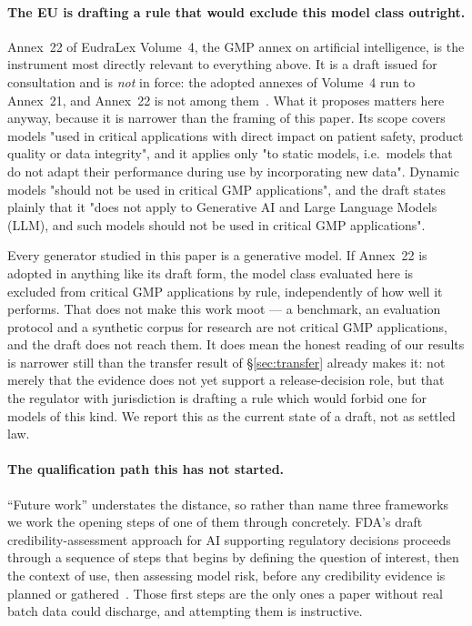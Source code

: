 \documentclass[11pt]{article}
\begin{document}
\paragraph{The EU is drafting a rule that would exclude this model class
outright.} Annex~22 of EudraLex Volume~4, the GMP annex on artificial
intelligence, is the instrument most directly relevant to everything above. It is
a draft issued for consultation and is \emph{not} in force: the adopted annexes
of Volume~4 run to Annex~21, and Annex~22 is not among
them~\citep{ec2025annex22}. What it proposes matters here anyway, because it is
narrower than the framing of this paper. Its scope covers models "used in
critical applications with direct impact on patient safety, product quality or
data integrity", and it applies only "to static models, i.e.\ models that do not
adapt their performance during use by incorporating new data". Dynamic models
"should not be used in critical GMP applications", and the draft states plainly
that it "does not apply to Generative AI and Large Language Models (LLM), and
such models should not be used in critical GMP applications".

Every generator studied in this paper is a generative model. If Annex~22 is
adopted in anything like its draft form, the model class evaluated here is
excluded from critical GMP applications by rule, independently of how well it
performs. That does not make this work moot --- a benchmark, an evaluation
protocol and a synthetic corpus for research are not critical GMP applications,
and the draft does not reach them. It does mean the honest reading of our results
is narrower still than the transfer result of \S\ref{sec:transfer} already makes
it: not merely that the evidence does not yet support a release-decision role,
but that the regulator with jurisdiction is drafting a rule which would forbid
one for models of this kind. We report this as the current state of a draft, not as settled law.

\paragraph{The qualification path this has not started.} ``Future work''
understates the distance, so rather than name three frameworks we work the
opening steps of one of them through concretely. FDA's draft
credibility-assessment approach for AI supporting regulatory decisions proceeds
through a sequence of steps that begins by defining the question of interest,
then the context of use, then assessing model risk, before any credibility
evidence is planned or gathered~\citep{fda2025aiguidance}. Those first steps are
the only ones a paper without real batch data could discharge, and attempting
them is instructive.
\end{document}
